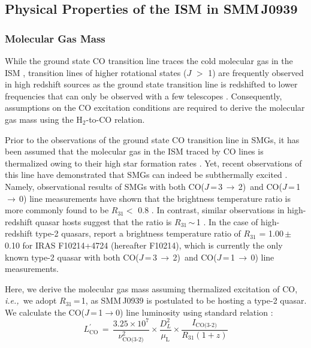 \documentclass[twocolumn,apj,numberedappendix]{emulateapj}
\newcommand{\rarr}{$\rightarrow$}
\newcommand{\CO}{\mbox{CO($J$\,=\,3\,$\rightarrow$\,2) }}
\newcommand{\eg}{{\sl e.g.,~}}
\newcommand{\ie}{{\sl i.e.,~}}
\begin{document}
\subsection{Physical Properties of the ISM in SMM\,J0939}
\subsubsection{Molecular Gas Mass}
While the ground state CO transition line traces the cold molecular gas in the ISM
\citep*[\eg][]{Wilson70a,Downes98a}, transition lines of higher rotational states ($J$ $>$ 1) are frequently observed in high redshift sources as the
 ground state transition line is redshifted to lower frequencies that can only be observed with a few telescopes 
 \citep{Carilli13a}. Consequently, assumptions on the CO excitation conditions are required to derive the molecular gas mass using the H$_\textrm{2}$-to-CO 
 relation. \par
Prior to the observations of the ground state CO transition line in SMGs, it has been assumed that the molecular gas in the
  ISM traced by CO lines is thermalized owing to their high star formation rates \citep[\eg][]{Greve05a, Coppin08a}.
   Yet, recent observations of this line have demonstrated that SMGs can indeed be subthermally excited
   \citep{Harris10a,Riechers11c,Riechers11d,Ivison11a}. Namely, observational results of SMGs with both \CO and CO($J$\,=\,1\,\rarr\,0) line measurements have shown that the 
   brightness temperature ratio is more commonly found to be $R_\textrm{31}<$ 0.8 \citep
   {Harris10a,Carilli10a,Swinbank2010a,Riechers11d,Ivison11a,Ivison10d}. In contrast, similar observations in high-redshift quasar hosts suggest that the ratio 
   is $R_\textrm{31}$\,$\sim$\,1 \citep{Riechers06a, Riechers11a, Scott11a}. In the case of high-redshift type-2 quasars, \citet{Riechers11a} report a brightness temperature ratio of $R_\textrm{31}$ = 1.00\,$\pm$\,0.10 for IRAS F10214+4724 (hereafter F10214), which is currently the only known type-2 quasar with both \CO and CO($J$\,=\,1\,\rarr\,0) line measurements. \par
Here, we derive the molecular gas mass 
assuming thermalized excitation of CO, 
\ie we adopt $R_\textrm{31}$\,=\,1, as SMM\,J0939 is 
postulated to be hosting a type-2 quasar. 
We calculate the CO($J$\,=\,1\rarr0) line luminosity using standard relation 
\citep[\eg][]{Solomon05a,Carilli13a}:
\begin{equation}
L^{\prime}_\textrm{CO}\,=\,\frac{3.25\times10^7}{\nu_\textrm{CO(3-2)}^2}\times \frac{D_L^2}{\mu_\textrm{L}} \times
\frac{I_\textrm{CO(3-2)}} {R_\textrm{31} (1 + z)}
\end{equation}
\end{document}
